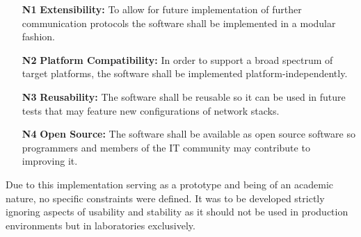 \begin{itemize}
    \item [\textbf{N1}] \textbf{Extensibility:} To allow for future implementation of further communication protocols the software shall be implemented in a modular fashion.
    \item [\textbf{N2}] \textbf{Platform Compatibility:} In order to support a broad spectrum of target platforms, the software shall be implemented platform-independently.
    \item [\textbf{N3}] \textbf{Reusability:} The software shall be reusable so it can be used in future tests that may feature new configurations of network stacks.
    \item [\textbf{N4}] \textbf{Open Source:} The software shall be available as open source software so programmers and members of the IT community may contribute to improving it.  
\end{itemize}

Due to this implementation serving as a prototype and being of an academic nature, no specific constraints were defined. It was to be developed strictly ignoring aspects of usability and stability as it should not be used in production environments but in laboratories exclusively.

